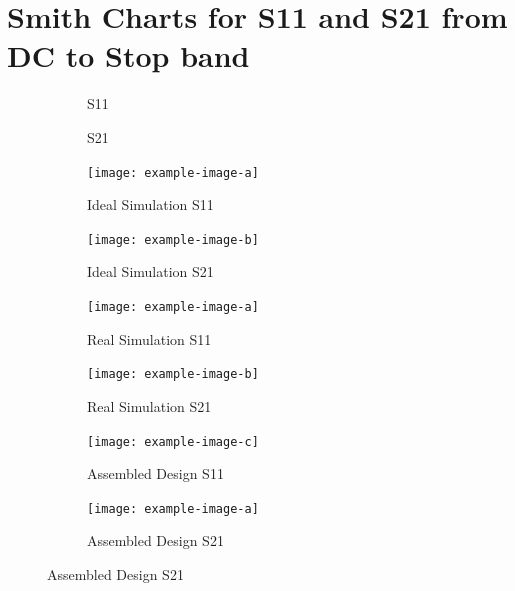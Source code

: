 \documentclass[letterpaper,12pt]{article}
\begin{document}
\section{Smith Charts for S11 and S21 from DC to Stop band}
\begin{figure}[H]
    \begin{subfigure}[t]{.49\textwidth}
        \centering
        S11
    \end{subfigure}
    \hfill
    \begin{subfigure}[t]{.49\textwidth}
        \centering
        S21
    \end{subfigure}

    \medskip
    
    \begin{subfigure}[t]{.49\textwidth}
      \centering
      \texttt{[image: example-image-a]}
      \caption{Ideal Simulation S11}
    \end{subfigure}
    \hfill
    \begin{subfigure}[t]{.49\textwidth}
      \centering
      \texttt{[image: example-image-b]}
      \caption{Ideal Simulation S21}
    \end{subfigure}

    \medskip
    
    \begin{subfigure}[t]{.49\textwidth}
      \centering
      \texttt{[image: example-image-a]}
      \caption{Real Simulation S11}
    \end{subfigure}
    \hfill
    \begin{subfigure}[t]{.49\textwidth}
      \centering
      \texttt{[image: example-image-b]}
      \caption{Real Simulation S21}
    \end{subfigure}
  
    \medskip
  
    \begin{subfigure}[t]{.49\textwidth}
      \centering
      \texttt{[image: example-image-c]}
      \caption{Assembled Design S11}
    \end{subfigure}
    \hfill
    \begin{subfigure}[t]{.49\textwidth}
      \centering
      \texttt{[image: example-image-a]}
      \caption{Assembled Design S21}
    \end{subfigure}
\end{figure}
\end{document}
